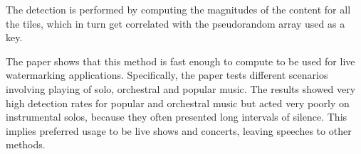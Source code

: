The detection is performed by computing the magnitudes of the content for all the tiles, which in turn get correlated with the pseudorandom array used as a key.


The paper shows that this method is fast enough to compute to be used for live watermarking applications. Specifically, the paper tests different scenarios involving playing of solo, orchestral and popular music. The results showed very high detection rates for popular and orchestral music but acted very poorly on instrumental solos, because 
they often presented long intervals of silence. This implies preferred usage to be live shows and concerts, leaving speeches to other methods.


